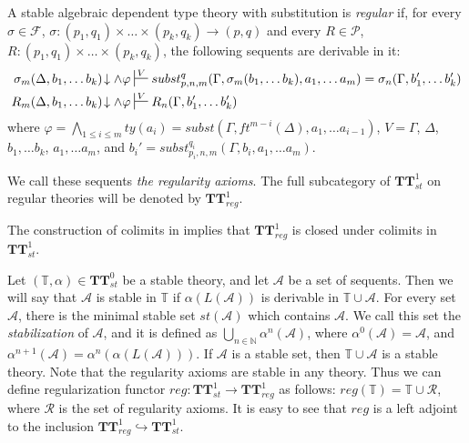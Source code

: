 \documentclass[reqno]{amsart}
\theoremstyle{definition}
\theoremstyle{remark}
\newcommand{\cat}[1]{\mathbf{#1}}
\newcommand{\algtt}{\cat{TT}}
\numberwithin{figure}{section}
\begin{document}
\begin{defn}
A stable algebraic dependent type theory with substitution is \emph{regular} if,
for every $\sigma \in \mathcal{F}$, $\sigma : (p_1,q_1) \times \ldots \times (p_k,q_k) \to (p,q)$
and every $R \in \mathcal{P}$, $R : (p_1,q_1) \times \ldots \times (p_k,q_k)$, the following sequents are derivable in it:
\begin{align*}
\sigma_m(\Delta, b_1, \ldots b_k)\!\downarrow \land \varphi & \sststile{}{V} subst^q_{p,n,m}(\Gamma, \sigma_m(b_1, \ldots b_k), a_1, \ldots a_m) = \sigma_n(\Gamma, b_1', \ldots b_k') \\
R_m(\Delta, b_1, \ldots b_k)\!\downarrow \land \varphi & \sststile{}{V} R_n(\Gamma, b_1', \ldots b_k')
\end{align*}
where $\varphi = \bigwedge_{1 \leq i \leq m} ty(a_i) = subst(\Gamma, ft^{m-i}(\Delta), a_1, \ldots a_{i-1})$, $V = \Gamma$, $\Delta$, $b_1, \ldots b_k$, $a_1, \ldots a_m$,
and $b_i' = subst^{q_i}_{p_i,n,m}(\Gamma, b_i, a_1, \ldots a_m)$.

We call these sequents \emph{the regularity axioms}.
The full subcategory of $\algtt^1_{st}$ on regular theories will be denoted by $\algtt^1_{reg}$.
\end{defn}

\begin{remark}
The construction of colimits in  implies that $\algtt^1_{reg}$ is closed under colimits in $\algtt^1_{st}$.
\end{remark}

Let $(\mathbb{T},\alpha) \in \algtt^0_{st}$ be a stable theory, and let $\mathcal{A}$ be a set of sequents.
Then we will say that $\mathcal{A}$ is stable in $\mathbb{T}$ if $\alpha(L(\mathcal{A}))$ is derivable in $\mathbb{T} \cup \mathcal{A}$.
For every set $\mathcal{A}$, there is the minimal stable set $st(\mathcal{A})$ which contains $\mathcal{A}$.
We call this set the \emph{stabilization} of $\mathcal{A}$, and it is defined as $\bigcup_{n \in \mathbb{N}} \alpha^n(\mathcal{A})$,
    where $\alpha^0(\mathcal{A}) = \mathcal{A}$, and $\alpha^{n+1}(\mathcal{A}) = \alpha^n(\alpha(L(\mathcal{A})))$.
If $\mathcal{A}$ is a stable set, then $\mathbb{T} \cup \mathcal{A}$ is a stable theory.
Note that the regularity axioms are stable in any theory.
Thus we can define regularization functor $reg : \algtt^1_{st} \to \algtt^1_{reg}$ as follows: $reg(\mathbb{T}) = \mathbb{T} \cup \mathcal{R}$,
    where $\mathcal{R}$ is the set of regularity axioms.
It is easy to see that $reg$ is a left adjoint to the inclusion $\algtt^1_{reg} \hookrightarrow \algtt^1_{st}$.
\end{document}
